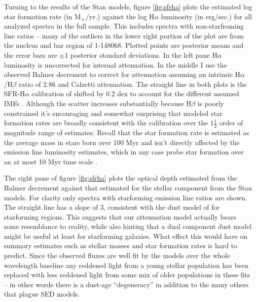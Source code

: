 \documentclass[modern]{aastex62}
\begin{document}
Turning to the results of the Stan models, figure \ref{fig:sfrha} plots the estimated log star formation rate (in M$_\sun$/yr.) against the log H$\alpha$ luminosity (in erg/sec.) for all analyzed spectra in the full sample. This includes spectra with non-starfroming line ratios -- many of the outliers in the lower right portion of the plot are from the nucleus and bar region of 1-148068. Plotted points are posterior means and the error bars are $\pm 1$ posterior standard deviations. In the left pane H$\alpha$ luminosity is uncorrected for internal attenuation. In the middle I use the observed Balmer decrement to correct for attenuation assuming an intrinsic H$\alpha$/H$\beta$ ratio of 2.86 and Calzetti attenuation. The straight line in both plots is the SFR-H$\alpha$ calibration of \citet{2006ApJ...642..775M} shifted by 0.2 dex to account for the different assumed IMFs \citep{2011ApJ...737...67M}. Although the scatter increases substantially because H$\beta$ is poorly constrained it's encouraging and somewhat surprising that modeled star formation rates are broadly consistent with the calibration over the $1 \frac{1}{2}$ order of magnitude range of estimates. Recall that the star formation rate is estimated as the average mass in stars born over 100 Myr and isn't directly affected by the emission line luminosity estimates, which in any case probe star formation over an at most 10 Myr time scale \citep{2012ARA&A..50..531K}.

The right pane of figure \ref{fig:sfrha} plots the optical depth estimated from the Balmer decrement against that estimated for the stellar component from the Stan models. For clarity only spectra with starforming emission line ratios are shown. The straight line has a slope of 3, consistent with the dust model of \citet{2000ApJ...539..718C} for starforming regions. This suggests that our attenuation model actually bears some resemblance to reality, while also hinting that a dual component dust model might be useful at least for starforming galaxies. What effect this would have on summary estimates such as stellar masses and star formation rates is hard to predict. Since the observed fluxes are well fit by the models over the whole wavelength baseline any reddened light from a young stellar population has been replaced with less reddened light from some mix of older populations in these fits -- in other words there is a dust-age ``degeneracy'' in addition to the many others that plague SED models.
\end{document}
